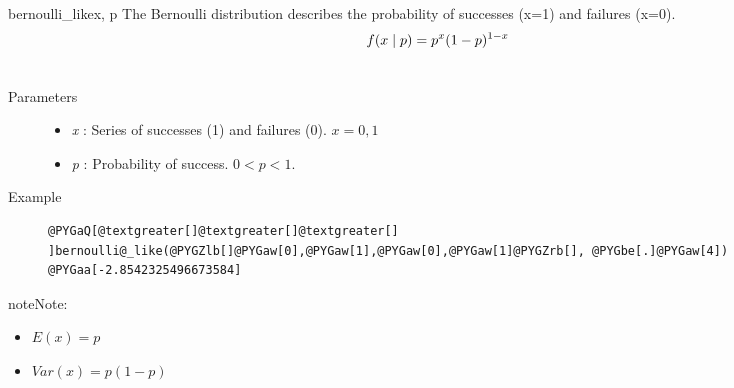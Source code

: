 \hypertarget{pymc.distributions.bernoulli_like}{}\begin{funcdesc}{bernoulli\_like}{x, p}
The Bernoulli distribution describes the probability of successes (x=1) and
failures (x=0).
\begin{gather}
\begin{split}f(x \mid p) = p^{x} (1-p)^{1-x}\end{split}\notag\\\begin{split}\end{split}\notag
\end{gather}\begin{description}
\item[Parameters] \leavevmode\begin{itemize}
\item {}
\emph{x} : Series of successes (1) and failures (0). $x=0,1$

\item {}
\emph{p} : Probability of success. $0 < p < 1$.

\end{itemize}

\item[Example] \leavevmode
\begin{Verbatim}[commandchars=@\[\]]
@PYGaQ[@textgreater[]@textgreater[]@textgreater[] ]bernoulli@_like(@PYGZlb[]@PYGaw[0],@PYGaw[1],@PYGaw[0],@PYGaw[1]@PYGZrb[], @PYGbe[.]@PYGaw[4])
@PYGaa[-2.8542325496673584]
\end{Verbatim}

\end{description}

\begin{notice}{note}{Note:}\begin{itemize}
\item {}
$E(x)= p$

\item {}
$Var(x)= p(1-p)$

\end{itemize}
\end{notice}
\end{funcdesc}

